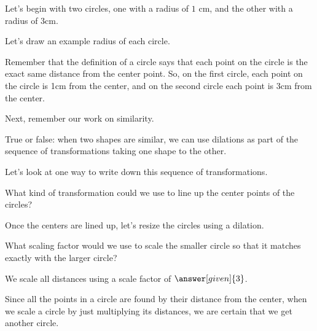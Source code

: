 \documentclass{ximera}
\begin{document}
\begin{example}
Let's begin with two circles, one with a radius of $1$ cm, and the other with a radius of $3$cm.
\begin{image}
\end{image}
Let's draw an example radius of each circle.
\begin{image}
\end{image}
Remember that the definition of a circle says that each point on the circle is the exact same distance from the center point. So, on the first circle, each point on the circle is 1cm from the center, and on the second circle each point is 3cm from the center.

Next, remember our work on similarity. 


True or false: when two shapes are similar, we can use dilations as part of the sequence of transformations taking one shape to the other.
\begin{multipleChoice}
\end{multipleChoice}


Let's look at one way to write down this sequence of transformations.


What kind of transformation could we use to line up the center points of the circles?
\begin{multipleChoice}
 \end{multipleChoice}
 
 Once the centers are lined up, let's resize the circles using a dilation.


 What scaling factor would we use to scale the smaller circle so that it matches exactly with the larger circle?
 \begin{prompt}
 We scale all distances using a scale factor of $\answer[given]{3}$.
 \end{prompt}


 Since all the points in a circle are found by their distance from the center, when we scale a circle by just multiplying its distances, we are certain that we get another circle.


\end{example}
\end{document}
